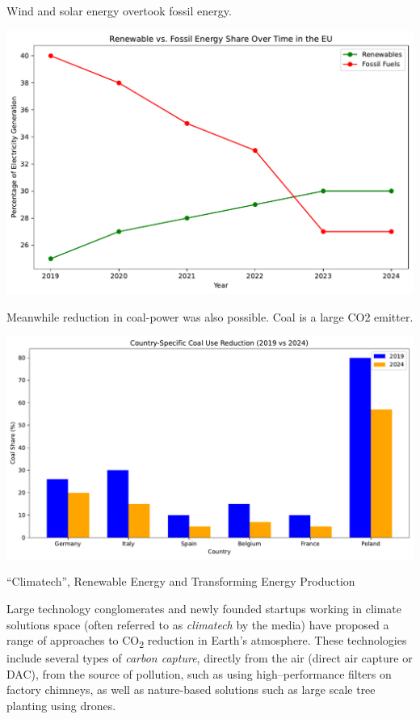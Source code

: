 \documentclass[
  letterpaper,
  DIV=11,
  numbers=noendperiod]{scrartcl}
\begin{document}
Wind and solar energy overtook fossil energy.

\includegraphics{_thesis_files/figure-pdf/cell-20-output-1.pdf}

Meanwhile reduction in coal-power was also possible. Coal is a large CO2
emitter.

\includegraphics{_thesis_files/figure-pdf/cell-21-output-1.pdf}

``Climatech'', Renewable Energy and Transforming Energy Production

Large technology conglomerates and newly founded startups working in
climate solutions space (often referred to as \emph{climatech} by the
media) have proposed a range of approaches to CO\textsubscript{2}
reduction in Earth's atmosphere. These technologies include several
types of \emph{carbon capture}, directly from the air (direct air
capture or DAC), from the source of pollution, such as using
high--performance filters on factory chimneys, as well as nature-based
solutions such as large scale tree planting using drones.
\end{document}
